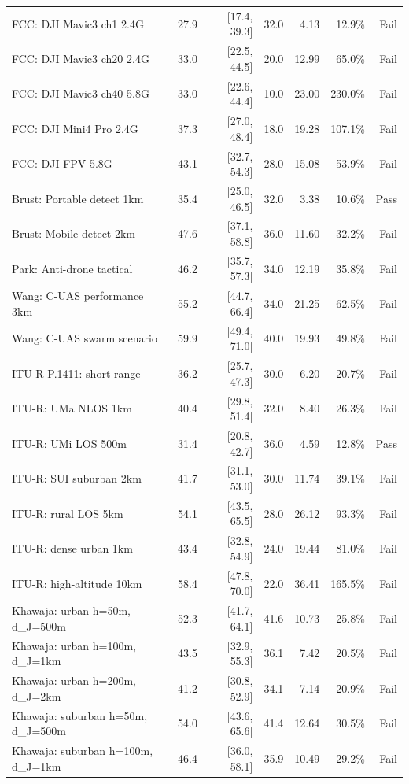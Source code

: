 \begin{table}[htbp]
\begin{tabular}{lrrrrrr}
FCC: DJI Mavic3 ch1 2.4G & 27.9 & [17.4, 39.3] & 32.0 & 4.13 & 12.9\% & Fail \\
FCC: DJI Mavic3 ch20 2.4G & 33.0 & [22.5, 44.5] & 20.0 & 12.99 & 65.0\% & Fail \\
FCC: DJI Mavic3 ch40 5.8G & 33.0 & [22.6, 44.4] & 10.0 & 23.00 & 230.0\% & Fail \\
FCC: DJI Mini4 Pro 2.4G & 37.3 & [27.0, 48.4] & 18.0 & 19.28 & 107.1\% & Fail \\
FCC: DJI FPV 5.8G & 43.1 & [32.7, 54.3] & 28.0 & 15.08 & 53.9\% & Fail \\
Brust: Portable detect 1km & 35.4 & [25.0, 46.5] & 32.0 & 3.38 & 10.6\% & Pass \\
Brust: Mobile detect 2km & 47.6 & [37.1, 58.8] & 36.0 & 11.60 & 32.2\% & Fail \\
Park: Anti-drone tactical & 46.2 & [35.7, 57.3] & 34.0 & 12.19 & 35.8\% & Fail \\
Wang: C-UAS performance 3km & 55.2 & [44.7, 66.4] & 34.0 & 21.25 & 62.5\% & Fail \\
Wang: C-UAS swarm scenario & 59.9 & [49.4, 71.0] & 40.0 & 19.93 & 49.8\% & Fail \\
ITU-R P.1411: short-range & 36.2 & [25.7, 47.3] & 30.0 & 6.20 & 20.7\% & Fail \\
ITU-R: UMa NLOS 1km & 40.4 & [29.8, 51.4] & 32.0 & 8.40 & 26.3\% & Fail \\
ITU-R: UMi LOS 500m & 31.4 & [20.8, 42.7] & 36.0 & 4.59 & 12.8\% & Pass \\
ITU-R: SUI suburban 2km & 41.7 & [31.1, 53.0] & 30.0 & 11.74 & 39.1\% & Fail \\
ITU-R: rural LOS 5km & 54.1 & [43.5, 65.5] & 28.0 & 26.12 & 93.3\% & Fail \\
ITU-R: dense urban 1km & 43.4 & [32.8, 54.9] & 24.0 & 19.44 & 81.0\% & Fail \\
ITU-R: high-altitude 10km & 58.4 & [47.8, 70.0] & 22.0 & 36.41 & 165.5\% & Fail \\
Khawaja: urban h=50m, d_J=500m & 52.3 & [41.7, 64.1] & 41.6 & 10.73 & 25.8\% & Fail \\
Khawaja: urban h=100m, d_J=1km & 43.5 & [32.9, 55.3] & 36.1 & 7.42 & 20.5\% & Fail \\
Khawaja: urban h=200m, d_J=2km & 41.2 & [30.8, 52.9] & 34.1 & 7.14 & 20.9\% & Fail \\
Khawaja: suburban h=50m, d_J=500m & 54.0 & [43.6, 65.6] & 41.4 & 12.64 & 30.5\% & Fail \\
Khawaja: suburban h=100m, d_J=1km & 46.4 & [36.0, 58.1] & 35.9 & 10.49 & 29.2\% & Fail \\

\end{tabular}
\end{table}

